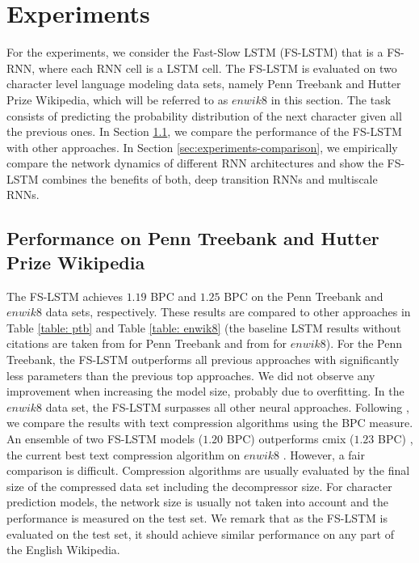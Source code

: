 \documentclass{article}
\begin{document}
\section{Experiments} \label{sec:Experiments}
For the experiments, we consider the Fast-Slow LSTM (FS-LSTM) that is a FS-RNN, where each RNN cell is a LSTM cell. The FS-LSTM is evaluated on two character level language modeling data sets, namely Penn Treebank and  Hutter Prize Wikipedia, which will be referred to as $enwik8$ in this section. The task consists of predicting the probability distribution of the next character given all the previous ones. In Section \ref{sec:experiments-state-of-the-art}, we compare the performance of the FS-LSTM with other approaches. In Section \ref{sec:experiments-comparison}, we empirically compare the network dynamics of different RNN architectures and show the FS-LSTM combines the benefits of both, deep transition RNNs and multiscale RNNs.


\subsection{Performance on Penn Treebank and Hutter Prize Wikipedia}\label{sec:experiments-state-of-the-art}

The FS-LSTM achieves  $1.19$ BPC and $1.25$ BPC on the Penn Treebank and $enwik8$ data sets, respectively. These results are compared to other approaches in Table \ref{table: ptb} and Table \ref{table: enwik8} (the baseline LSTM results without citations are taken from \cite{zoph2016NASCell} for Penn Treebank and from \cite{ha2016hyper} for $enwik8$). For the Penn Treebank, the FS-LSTM outperforms all previous approaches with  significantly less parameters than the previous top approaches. We did not observe any improvement when increasing the model size, probably due to overfitting. In the  $enwik8$ data set, the FS-LSTM surpasses all other neural approaches. Following \cite{graves2014neural}, we compare the results with text compression algorithms using the BPC measure. An ensemble of two FS-LSTM models ($1.20$ BPC) outperforms cmix ($1.23$ BPC) \cite{cmix}, the current best  text compression algorithm on $enwik8$ \cite{largetextcompressionbenchmark}. However, a fair comparison is difficult. Compression algorithms are usually evaluated by the final size of the compressed data set including the decompressor size. For character prediction models, the network size is usually not taken into account and the performance is measured on the test set. We remark that as the FS-LSTM is evaluated on the test set, it should achieve similar performance on any part of the English Wikipedia.
\end{document}
